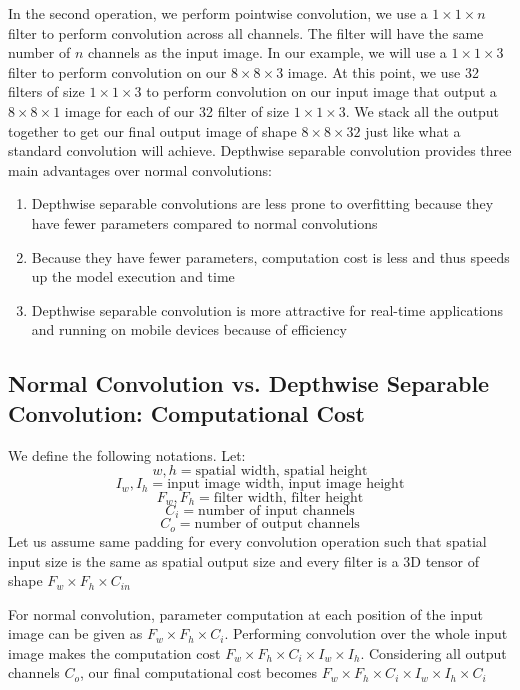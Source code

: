 \documentclass[master]{thesis-uestc}
\begin{document}
In the second operation, we perform pointwise convolution, we use a $1\times1\times n$ filter to perform convolution across all channels. The filter will have the same number of $n$ channels as the input image. In our example, we will use a $1\times1\times3$ filter to perform convolution on our $8\times8\times3$ image. At this point, we use 32 filters of size $1\times1\times3$ to perform convolution on our input image that output a $8\times8\times1$ image for each of our 32 filter of size $1\times1\times3$. We stack all the output together to get our final output image of shape $8\times8\times32$ just like what a standard convolution will achieve. Depthwise separable convolution provides three main advantages over normal convolutions:
\begin{enumerate}
    \item Depthwise separable convolutions are less prone to overfitting because they have fewer parameters compared to normal convolutions
    \item Because they have fewer parameters, computation cost is less and thus speeds up the model execution and time
    \item Depthwise separable convolution is more attractive for real-time applications and running on mobile devices because of efficiency
\end{enumerate}

\subsection*{Normal Convolution vs. Depthwise Separable Convolution: Computational Cost}
We define the following notations. Let:
    \[w, h = \text{spatial width, spatial height}\]
    \[I_w, I_h = \text{input image width, input image height} \]
    \[F_w, F_h = \text{filter width, filter height}\]
    \[C_i = \text{number of input channels}\]
    \[C_o = \text{number of output channels}\]
Let us assume same padding for every convolution operation such that spatial input size is the same as spatial output size and every filter is a 3D tensor of shape $F_w \times F_h \times C_{in}$

For normal convolution, parameter computation at each position of the input image can be given as $F_w \times F_h \times C_i$. Performing convolution over the whole input image makes the computation cost $F_w \times F_h \times C_i \times I_w \times I_h$. Considering all output channels $C_o$, our final computational cost becomes $F_w \times F_h \times C_i \times I_w \times I_h \times C_i$
\end{document}
